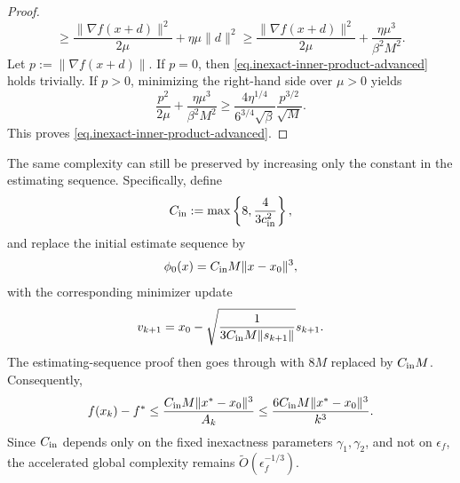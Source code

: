 \begin{itemize}
{\begin{proof}
\[                      \ge
                      \frac{\|\nabla f(x+d)\|^2}{2\mu}
                      +
                      \eta\mu\|d\|^2
                      \ge
                      \frac{\|\nabla f(x+d)\|^2}{2\mu}
                      +
                      \frac{\eta\mu^3}{\beta^2M^2}.
                  \]
                  Let \(p:=\|\nabla f(x+d)\|\). If \(p=0\), then
                  \eqref{eq.inexact-inner-product-advanced} holds trivially. If \(p>0\),
                  minimizing the right-hand side over \(\mu>0\) yields
                  \[
                      \frac{p^2}{2\mu}
                      +
                      \frac{\eta\mu^3}{\beta^2M^2}
                      \ge
                      \frac{4\eta^{1/4}}{6^{3/4}\sqrt{\beta}}
                      \frac{p^{3/2}}{\sqrt M}.
                  \]
                  This proves \eqref{eq.inexact-inner-product-advanced}.
              \end{proof}
              The same complexity can still be preserved by increasing only
              the constant in the estimating sequence. Specifically, define
              \[
                  C_{\rm in}
                  :=
                  \max\left\{
                  8,\frac{4}{3c_{\rm in}^2}
                  \right\},
              \]
              and replace the initial estimate sequence by
              \[
                  \phi_0(x)=C_{\rm in}M\|x-x_0\|^3,
              \]
              with the corresponding minimizer update
              \[
                  v_{k+1}
                  =
                  x_0-\sqrt{
                      \frac{1}{3C_{\rm in}M\|s_{k+1}\|}
                  }
                  s_{k+1}.
              \]
              The estimating-sequence proof then goes through with \(8M\) replaced by
              \(C_{\rm in}M\). Consequently,
              \[
                  f(x_k)-f^*
                  \le
                  \frac{C_{\rm in}M\|x^*-x_0\|^3}{A_k}
                  \le
                  \frac{6C_{\rm in}M\|x^*-x_0\|^3}{k^3}.
              \]
              Since \(C_{\rm in}\) depends only on the fixed inexactness parameters
              \(\gamma_1,\gamma_2\), and not on \(\epsilon_f\), the accelerated global
              complexity remains
              \(
              \tilde O(\epsilon_f^{-1/3}).
              \)\\
}
\end{itemize}
